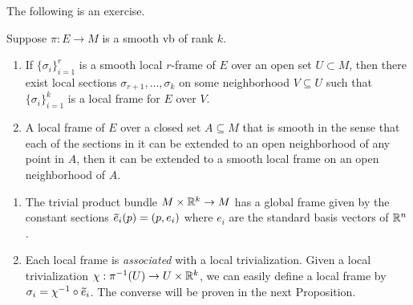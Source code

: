 The following is an exercise.
\begin{prop}\label{prop 10.15 Lee}
    Suppose $\pi:E\to M$ is a smooth \gls{vb} of rank $k$.
    \begin{enumerate}[label=(\alph*)]
        \item If $\{\sigma_i\}_{i=1}^r$ is a smooth local $r$-frame of $E$ over an open set $U\subset M$, then there exist local sections $\sigma_{r+1},\ldots,\sigma_k$ on some neighborhood $V\subseteq U$ such that $\{\sigma_i\}_{i=1}^k$ is a local frame for $E$ over $V$.
        \item A local frame of $E$ over a closed set $A\subseteq M$ that is smooth in the sense that each of the sections in it can be extended to an open neighborhood of any point in $A$, then it can be extended to a smooth local frame on an open neighborhood of $A$.
    \end{enumerate}
\end{prop}

\begin{example}
    \begin{enumerate}
        \item The trivial product bundle $M\times\mathbb{R}^k\to M$ has a global frame given by the constant sections $\wt{e}_i(p)=(p,e_i)$ where $e_i$ are the standard basis vectors of $\mathbb{R}^n$.
        \item Each local frame is \emph{associated} with a local trivialization. Given a local trivialization $\chi:\pi^{-1}(U)\to U\times\mathbb{R}^k$, we can easily define a local frame by $\sigma_i=\chi^{-1}\circ\wt{e}_i$. The converse will be proven in the next Proposition.
    \end{enumerate}
\end{example}

